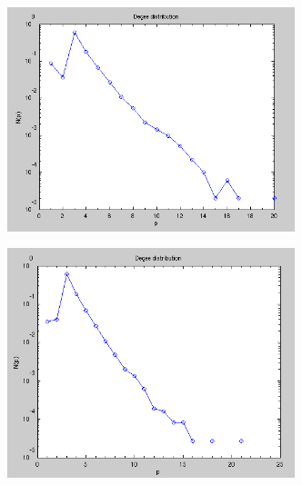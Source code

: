 \begin{figure}[H]
\begin{subfigure}{0.45\textwidth}
    \includegraphics[width=0.92\textwidth]{Figures/chapter-image/avizo/ActinZ39b21l5-histo-degree.png}%
  \end{subfigure}
  \begin{subfigure}{0.45\textwidth}
    \centering
    \includegraphics[width=0.92\textwidth]{Figures/chapter-image/avizo/ActinZ39b21l8-histo-degree.png}%
  \end{subfigure}\\[1ex]
  \begin{subfigure}{0.45\textwidth}
    \centering

\end{subfigure}
\end{figure}
